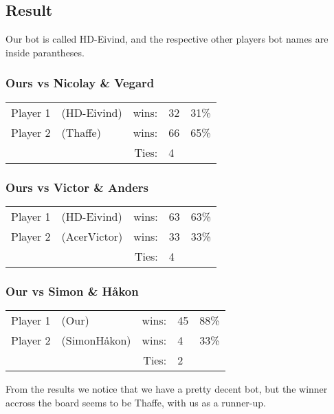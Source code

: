 \documentclass[12pt, a4paper]{article}
\begin{document}
\subsection{Result}
Our bot is called HD-Eivind, and the respective other players bot names are inside parantheses.
\subsubsection{Ours vs Nicolay \& Vegard }

  \begin{tabular}{| l  l  r l c|}
    \hline
 	Player 1 & (HD-Eivind) & wins: & 32 & 31\% \\
 	Player 2 & (Thaffe) & wins: & 66 & 65\% \\
 	& &  Ties: & 4 & \\
    \hline
  \end{tabular}

\subsubsection{Ours vs Victor \& Anders}
  \begin{tabular}{| l  l  r l c|}
    \hline
 	Player 1 & (HD-Eivind) & wins: & 63 & 63\% \\
 	Player 2 & (AcerVictor) & wins: & 33 & 33\% \\
 	& &  Ties: & 4 & \\
    \hline
  \end{tabular}
\subsubsection{Our vs Simon \& Håkon}


  \begin{tabular}{| l  l  r l c|}
    \hline
 	Player 1 & (Our) & wins: & 45 & 88\% \\
 	Player 2 & (SimonHåkon) & wins: & 4 & 33\% \\
 	& &  Ties: & 2 & \\
    \hline
  \end{tabular}


From the results we notice that we have a pretty decent bot, but the winner accross the board seems to be Thaffe, with us as a runner-up. 
\end{document}
